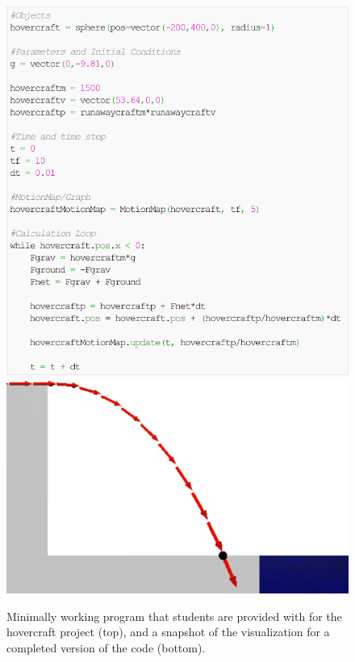 \documentclass{msuphddissertation}
\begin{document}
\begin{doublespace}
\begin{figure}
\centering
\includegraphics[width=1\linewidth]{./images/code.pdf}\vspace{0.1in}
\includegraphics[width=1\linewidth]{./images/visual.pdf}
\caption{Minimally working program that students are provided with for the hovercraft project (top), and a snapshot of the visualization for a completed version of the code (bottom).}\label{fig:code}
\end{figure}


\end{doublespace}
\end{document}
